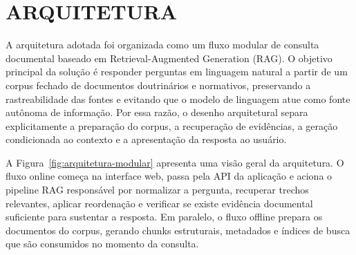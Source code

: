 
\section{ARQUITETURA}

A arquitetura adotada foi organizada como um fluxo modular de consulta documental baseado em Retrieval-Augmented Generation (RAG). O objetivo principal da solução é responder perguntas em linguagem natural a partir de um corpus fechado de documentos doutrinários e normativos, preservando a rastreabilidade das fontes e evitando que o modelo de linguagem atue como fonte autônoma de informação. Por essa razão, o desenho arquitetural separa explicitamente a preparação do corpus, a recuperação de evidências, a geração condicionada ao contexto e a apresentação da resposta ao usuário.

A Figura~\ref{fig:arquitetura-modular} apresenta uma visão geral da arquitetura. O fluxo online começa na interface web, passa pela API da aplicação e aciona o pipeline RAG responsável por normalizar a pergunta, recuperar trechos relevantes, aplicar reordenação e verificar se existe evidência documental suficiente para sustentar a resposta. Em paralelo, o fluxo offline prepara os documentos do corpus, gerando chunks estruturais, metadados e índices de busca que são consumidos no momento da consulta.

